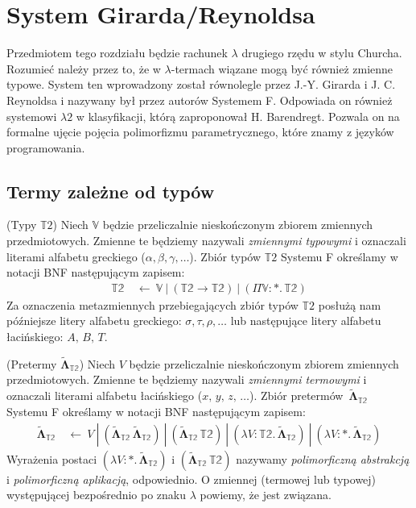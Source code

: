 \section{System Girarda/Reynoldsa}\label{sec:system_f}

Przedmiotem tego rozdziału będzie rachunek \(\lambda\) drugiego rzędu w stylu Churcha. Rozumieć należy przez to, że w \(\lambda\)-termach wiązane mogą być również zmienne typowe. System ten wprowadzony został równolegle przez J.-Y. Girarda i J. C. Reynoldsa i nazywany był przez autorów Systemem F. Odpowiada on również systemowi \(\lambda 2\) w klasyfikacji, którą zaproponował H. Barendregt. Pozwala on na formalne ujęcie pojęcia polimorfizmu parametrycznego, które znamy z języków programowania.

\subsection{Termy zależne od typów}

\begin{definicja}(Typy \(\mathbb{T}2\))
  Niech \(\mathbb{V}\) będzie przeliczalnie nieskończonym zbiorem zmiennych przedmiotowych. Zmienne te będziemy nazywali \emph{zmiennymi typowymi} i oznaczali literami alfabetu greckiego (\(\alpha, \beta, \gamma, \dots\)). Zbiór typów \(\mathbb{T}2\) Systemu F określamy w notacji BNF następującym zapisem:
  \begin{align*}
    \mathbb{T2}\ &\leftarrow\ \mathbb{V}\ |\ (\mathbb{T2}\to\mathbb{T2})\ |\ (\Pi \mathbb{V}:*.\,\mathbb{T2})
  \end{align*}
Za oznaczenia metazmiennych przebiegających zbiór typów \(\mathbb{T}2\) posłużą nam późniejsze litery alfabetu greckiego: \(\sigma,\tau,\rho,\dots\) lub następujące litery alfabetu łacińskiego: \(A,\, B,\, T\).
\end{definicja}
\begin{definicja}(Pretermy \(\mathbf{\tilde\Lambda}_\mathbb{T2}\))
  Niech \(V\) będzie przeliczalnie nieskończonym zbiorem zmiennych przedmiotowych. Zmienne te będziemy nazywali \emph{zmiennymi termowymi} i oznaczali literami alfabetu łacińskiego (\(x,\, y,\, z,\,\dots\)). Zbiór pretermów~\(\mathbf{\tilde\Lambda}_\mathbb{T2}\) Systemu F określamy w notacji BNF następującym zapisem:
  \begin{align*}
      \mathbf{\tilde\Lambda}_\mathbb{T2}\ &\leftarrow \ V\ |\ (\mathbf{\tilde\Lambda}_\mathbb{T2}\,\mathbf{\tilde\Lambda}_\mathbb{T2}) \ |\ (\mathbf{\tilde\Lambda}_\mathbb{T2}\,\mathbb{T2}) \ |\ (\lambda V:\mathbb{T2}.\, \mathbf{\tilde\Lambda}_\mathbb{T2})\ |\ (\lambda V:*.\, \mathbf{\tilde\Lambda}_\mathbb{T2})
  \end{align*}
  Wyrażenia postaci \((\lambda V:*.\, \mathbf{\tilde\Lambda}_\mathbb{T2})\) i \((\mathbf{\tilde\Lambda}_\mathbb{T2}\,\mathbb{T2})\) nazywamy \emph{polimorficzną abstrakcją} i \emph{polimorficzną aplikacją}, odpowiednio. O zmiennej (termowej lub typowej) występującej bezpośrednio po znaku \(\lambda\) powiemy, że jest związana.  
\end{definicja}

